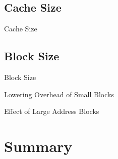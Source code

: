 \documentclass{beamer}
\begin{document}
\subsection{Cache Size}
\begin{frame}{Cache Size}
	
\end{frame}

\subsection{Block Size}
\begin{frame}{Block Size}
	
\end{frame}

\begin{frame}{Lowering Overhead of Small Blocks}
	
\end{frame}

\begin{frame}{Effect of Large Address Blocks}
	
\end{frame}




\section*{Summary}
\end{document}
